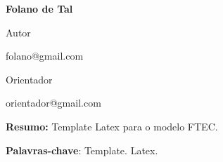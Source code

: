 \begin{Spacing}{1.0}

\begin{center}
    \ABNTEXchapterfont\bfseries\large\imprimirtitulo
\end{center}
\hfill

\hspace*{0pt}\hfill \bfseries\normalsize Folano de Tal

\hspace*{0pt}\hfill \normalfont Autor

\hspace*{0pt}\hfill \normalfont folano@gmail.com

\hfill

\hspace*{0pt}\hfill
{\bfseries\normalsize\imprimirorientador\par}

\hspace*{0pt}\hfill \normalfont\normalsize Orientador

\hspace*{0pt}\hfill \normalfont orientador@gmail.com

\hfill

\hfill

\begin{resumo}
    
\textbf{Resumo:}
Template Latex para o modelo FTEC.
\lipsum[1]

\hfill

\textbf{Palavras-chave}:
Template. Latex.
\end{resumo}
\end{Spacing}\PRIVATEclearpageifneeded

